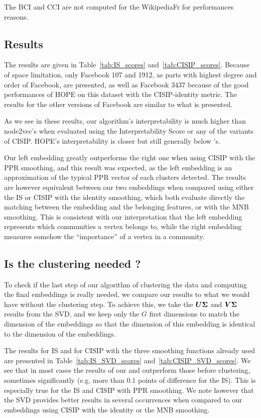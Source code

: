The BCI and CCI are not computed for the WikipediaFr for performances reasons.

\subsection{Results}
The results are given in Table~\ref{tab:IS_scores} and~\ref{tab:CISIP_scores}. Because of space limitation, only Facebook 107 and 1912, as parts with highest degree and order of Facebook, are presented, as well as Facebook 3437 because of the good performances of HOPE on this dataset with the CISIP-identity metric. The results for the other versions of Facebook are similar to what is presented.

As we see in these results, our algorithm's interpretability is much higher than node2vec's when evaluated using the Interpretability Score or any of the variants of CISIP. HOPE's interpretability is closer but still generally below \parfaite's.

Our left embedding greatly outperforms the right one when using CISIP with the PPR smoothing, and this result was expected, as the left embedding is an approximation of the typical PPR vector of each clusters detected. The results are however equivalent between our two embeddings when compared using either the IS or CISIP with the identity smoothing, which both evaluate directly the matching between the embedding and the belonging features, or with the MNB smoothing. This is consistent with our interpretation that the left embedding represents which communities a vertex belongs to, while the right embedding measures somehow the ``importance'' of a vertex in a community.

\subsection{Is the clustering needed ?}
To check if the last step of our algorithm of clustering the data and computing the final embeddings is really needed, we compare our results to what we would have without the clustering step. To achieve this, we take the $\boldsymbol{U}\boldsymbol{\Sigma}$ and $\boldsymbol{V}\boldsymbol{\Sigma}$ results from the SVD, and we keep only the $G$ first dimensions to match the dimension of the \parfaite embeddings so that the dimension of this embedding is identical to the dimension of the \parfaite embeddings.

The results for IS and for CISIP with the three smoothing functions already used are presented in Table~\ref{tab:IS_SVD_scores} and~\ref{tab:CISIP_SVD_scores}. We see that in most cases the results of our \newembLeft and \newembRight outperform those before clustering, sometimes significantly (e.g. more than $0.1$ points of difference for the IS). This is especially true for the IS and CISIP with PPR smoothing. We note however that the SVD provides better results in several occurrences when compared to our embeddings using CISIP with the identity or the MNB smoothing.

